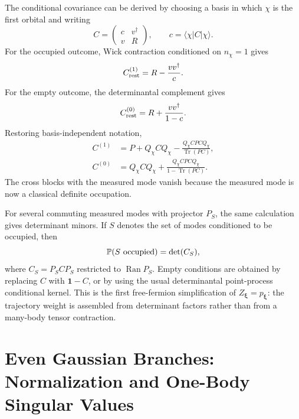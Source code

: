 \documentclass[aps,prb,onecolumn,nofootinbib,superscriptaddress]{revtex4-2}
\newcommand{\I}{\mathbf{1}}
\newcommand{\Prob}{\mathbb{P}}
\newcommand{\Tr}{\operatorname{Tr}}
\newcommand{\ket}[1]{\lvert #1\rangle}
\newcommand{\bra}[1]{\langle #1\rvert}
\newcommand{\bxi}{{\boldsymbol{\xi}}}
\theoremstyle{plain}
\theoremstyle{definition}
\begin{document}
The conditional covariance can be derived by choosing a basis in which
\(\chi\) is the first orbital and writing
\begin{equation}
  C=
  \begin{pmatrix}
    c & v^\dagger\\
    v & R
  \end{pmatrix},
  \qquad
  c=\bra{\chi}C\ket{\chi}.
  \label{eq:C-block-for-conditioning}
\end{equation}
For the occupied outcome, Wick contraction conditioned on \(n_\chi=1\) gives
\begin{equation}
  C^{(1)}_{\rm rest}=R-\frac{vv^\dagger}{c}.
  \label{eq:occupied-schur}
\end{equation}
For the empty outcome, the determinantal complement gives
\begin{equation}
  C^{(0)}_{\rm rest}=R+\frac{vv^\dagger}{1-c}.
  \label{eq:empty-schur}
\end{equation}
Restoring basis-independent notation,
\begin{align}
  C^{(1)}
  &=
  P+Q_\chi C Q_\chi
  -
  \frac{Q_\chi C P C Q_\chi}{\Tr(PC)},
  \label{eq:C-occupied-update}\\
  C^{(0)}
  &=
  Q_\chi C Q_\chi
  +
  \frac{Q_\chi C P C Q_\chi}{1-\Tr(PC)} .
  \label{eq:C-empty-update}
\end{align}
The cross blocks with the measured mode vanish because the measured mode is
now a classical definite occupation.

For several commuting measured modes with projector \(P_S\), the same
calculation gives determinant minors.  If \(S\) denotes the set of modes
conditioned to be occupied, then
\begin{equation}
  \Prob(S\ {\rm occupied})
  =
  \det(C_S),
  \label{eq:minor-occupied}
\end{equation}
where \(C_S=P_S C P_S\) restricted to \(\operatorname{Ran}P_S\).  Empty
conditions are obtained by replacing \(C\) with \(\I-C\), or by using the
usual determinantal point-process conditional kernel.  This is the first
free-fermion simplification of \(Z_\bxi=p_\bxi\): the trajectory weight is
assembled from determinant factors rather than from a many-body tensor
contraction.

\section{Even Gaussian Branches: Normalization and One-Body Singular Values}
\label{sec:even-gaussian-branches}
\end{document}
